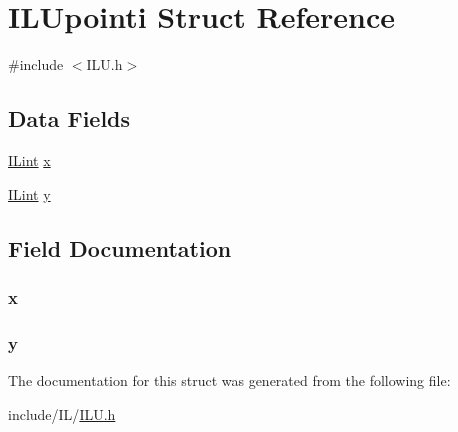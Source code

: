 \hypertarget{struct_i_l_upointi}{\section{I\+L\+Upointi Struct Reference}
\label{struct_i_l_upointi}
}


{\ttfamily \#include $<$I\+L\+U.\+h$>$}

\subsection*{Data Fields}
\begin{DoxyCompactItemize}
\item 
\hyperlink{group__il__types_ga8effe51a00daaa0878631e5af75a36cb}{I\+Lint} \hyperlink{struct_i_l_upointi_a08e8db6d88cf765e04038598c571d2d1}{x}
\item 
\hyperlink{group__il__types_ga8effe51a00daaa0878631e5af75a36cb}{I\+Lint} \hyperlink{struct_i_l_upointi_abe523ff61c0d360d3139b1066c132d2f}{y}
\end{DoxyCompactItemize}


\subsection{Field Documentation}
\hypertarget{struct_i_l_upointi_a08e8db6d88cf765e04038598c571d2d1}{
\subsubsection[{x}]{ x}}\label{struct_i_l_upointi_a08e8db6d88cf765e04038598c571d2d1}
\hypertarget{struct_i_l_upointi_abe523ff61c0d360d3139b1066c132d2f}{
\subsubsection[{y}]{ y}}\label{struct_i_l_upointi_abe523ff61c0d360d3139b1066c132d2f}


The documentation for this struct was generated from the following file\+:\begin{DoxyCompactItemize}
\item 
include/\+I\+L/\hyperlink{_i_l_u_8h}{I\+L\+U.\+h}\end{DoxyCompactItemize}
